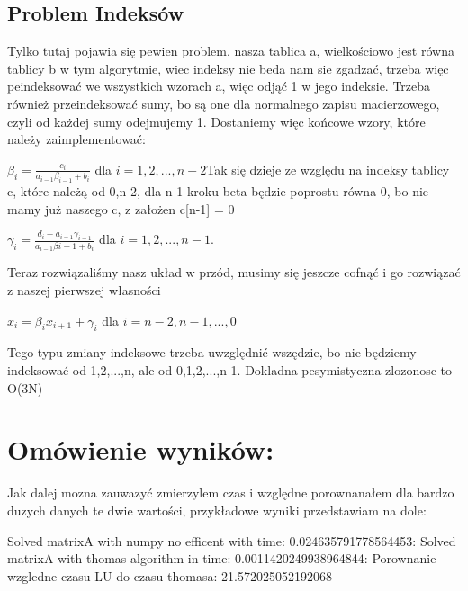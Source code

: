 \documentclass[12pt]{article}
\begin{document}
\subsection{Problem Indeksów}
Tylko tutaj pojawia się pewien problem, nasza tablica a, wielkościowo jest równa tablicy b w tym algorytmie, wiec indeksy nie beda nam sie zgadzać, trzeba więc peindeksować we wszystkich wzorach a, więc odjąć 1 w jego indeksie. Trzeba również przeindeksować sumy, bo są one dla normalnego zapisu macierzowego, czyli od każdej sumy odejmujemy 1. Dostaniemy więc końcowe wzory, które należy zaimplementować:
\begin{center}
$\beta_{i} = \frac{c_{i}}{a_{i-1}\beta_{i-1}+b_{i}}$ dla $i=1,2,...,n-2$\newline\newline Tak się dzieje ze względu na indeksy tablicy c, które należą od 0,n-2, dla n-1 kroku beta będzie poprostu równa 0, bo nie mamy już naszego c, z założen c[n-1] = 0
\end{center}
\begin{center}
$\gamma_{i} = \frac{d_{i}-a_{i-1}\gamma_{i-1}}{a_{i-1}\beta{i-1}+b_{i}}$ dla $i=1,2,...,n-1$.\newline\newline
\end{center}
Teraz rozwiązaliśmy nasz układ w przód, musimy się jeszcze cofnąć i go rozwiązać z naszej pierwszej własności 
\begin{center}
$x_{i} = \beta_{i}x_{i+1}+\gamma_{i}$ dla $i = n-2, n-1,...,0$
\end{center}
Tego typu zmiany indeksowe trzeba uwzględnić wszędzie, bo nie będziemy indeksować od 1,2,...,n, ale od 0,1,2,...,n-1.
Dokladna pesymistyczna zlozonosc to O(3N)
\section{Omówienie wyników:}
Jak dalej mozna zauwazyć zmierzylem czas i względne porownanałem dla bardzo duzych danych te dwie wartości, przykładowe wyniki przedstawiam na dole:
\begin{center}
    Solved matrixA with numpy no efficent with time: 0.024635791778564453:
    \newline\newline
    Solved matrixA with thomas algorithm in time: 0.0011420249938964844:
    \newline\newline
    Porownanie wzgledne czasu LU do czasu thomasa: 21.572025052192068
\end{center}
\end{document}
